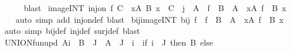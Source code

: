 \begin{isabellebody}
\ \ \ \ \isamarkupfalse%
\ blast\isanewline
{}\isamarkupfalse%
%
\endisatagproof
{\isafoldproof}%
%
\isadelimproof
\isanewline
%
\endisadelimproof
\isanewline
\isanewline
{}\isamarkupfalse%
\ image{\isacharunderscore}{\kern0pt}INT{\isacharcolon}{\kern0pt}\ {\isachardoublequoteopen}inj{\isacharunderscore}{\kern0pt}on\ f\ C\ {\isasymLongrightarrow}\ {\isasymforall}x{\isasymin}A{\isachardot}{\kern0pt}\ B\ x\ {\isasymsubseteq}\ C\ {\isasymLongrightarrow}\ j\ {\isasymin}\ A\ {\isasymLongrightarrow}\ f\ {\isacharbackquote}{\kern0pt}\ {\isacharparenleft}{\kern0pt}{\isasymInter}{\isacharparenleft}{\kern0pt}B\ {\isacharbackquote}{\kern0pt}\ A{\isacharparenright}{\kern0pt}{\isacharparenright}{\kern0pt}\ {\isacharequal}{\kern0pt}\ {\isacharparenleft}{\kern0pt}{\isasymInter}x{\isasymin}A{\isachardot}{\kern0pt}\ f\ {\isacharbackquote}{\kern0pt}\ B\ x{\isacharparenright}{\kern0pt}{\isachardoublequoteclose}\isanewline
%
\isadelimproof
\ \ %
\endisadelimproof
%
\isatagproof
{}\isamarkupfalse%
\ {\isacharparenleft}{\kern0pt}auto\ simp\ add{\isacharcolon}{\kern0pt}\ inj{\isacharunderscore}{\kern0pt}on{\isacharunderscore}{\kern0pt}def{\isacharparenright}{\kern0pt}\ blast%
\endisatagproof
{\isafoldproof}%
%
\isadelimproof
\isanewline
%
\endisadelimproof
\isanewline
{}\isamarkupfalse%
\ bij{\isacharunderscore}{\kern0pt}image{\isacharunderscore}{\kern0pt}INT{\isacharcolon}{\kern0pt}\ {\isachardoublequoteopen}bij\ f\ {\isasymLongrightarrow}\ f\ {\isacharbackquote}{\kern0pt}\ {\isacharparenleft}{\kern0pt}{\isasymInter}{\isacharparenleft}{\kern0pt}B\ {\isacharbackquote}{\kern0pt}\ A{\isacharparenright}{\kern0pt}{\isacharparenright}{\kern0pt}\ {\isacharequal}{\kern0pt}\ {\isacharparenleft}{\kern0pt}{\isasymInter}x{\isasymin}A{\isachardot}{\kern0pt}\ f\ {\isacharbackquote}{\kern0pt}\ B\ x{\isacharparenright}{\kern0pt}{\isachardoublequoteclose}\isanewline
%
\isadelimproof
\ \ %
\endisadelimproof
%
\isatagproof
{}\isamarkupfalse%
\ {\isacharparenleft}{\kern0pt}auto\ simp{\isacharcolon}{\kern0pt}\ bij{\isacharunderscore}{\kern0pt}def\ inj{\isacharunderscore}{\kern0pt}def\ surj{\isacharunderscore}{\kern0pt}def{\isacharparenright}{\kern0pt}\ blast%
\endisatagproof
{\isafoldproof}%
%
\isadelimproof
\isanewline
%
\endisadelimproof
\isanewline
{}\isamarkupfalse%
\ UNION{\isacharunderscore}{\kern0pt}fun{\isacharunderscore}{\kern0pt}upd{\isacharcolon}{\kern0pt}\ {\isachardoublequoteopen}{\isasymUnion}{\isacharparenleft}{\kern0pt}A{\isacharparenleft}{\kern0pt}i\ {\isacharcolon}{\kern0pt}{\isacharequal}{\kern0pt}\ B{\isacharparenright}{\kern0pt}\ {\isacharbackquote}{\kern0pt}\ J{\isacharparenright}{\kern0pt}\ {\isacharequal}{\kern0pt}\ {\isasymUnion}{\isacharparenleft}{\kern0pt}A\ {\isacharbackquote}{\kern0pt}\ {\isacharparenleft}{\kern0pt}J\ {\isacharminus}{\kern0pt}\ {\isacharbraceleft}{\kern0pt}i{\isacharbraceright}{\kern0pt}{\isacharparenright}{\kern0pt}{\isacharparenright}{\kern0pt}\ {\isasymunion}\ {\isacharparenleft}{\kern0pt}if\ i\ {\isasymin}\ J\ then\ B\ else\ {\isacharbraceleft}{\kern0pt}{\isacharbraceright}{\kern0pt}{\isacharparenright}{\kern0pt}{\isachardoublequoteclose}\isanewline

\end{isabellebody}
